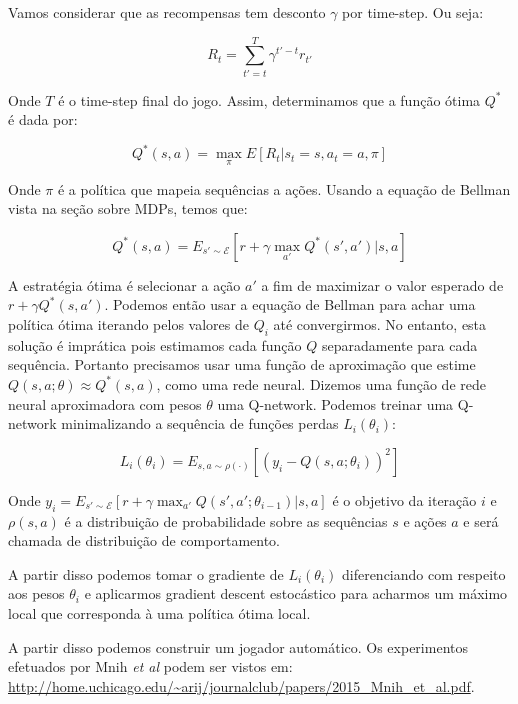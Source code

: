 \documentclass[a4paper,10pt]{article}
\theoremstyle{plain}
\begin{document}
Vamos considerar que as recompensas tem desconto $\gamma$ por time-step. Ou seja:

\begin{equation*}
  R_t = \sum_{t'=t}^T \gamma^{t'-t}r_{t'}
\end{equation*}

Onde $T$ é o time-step final do jogo. Assim, determinamos que a função ótima $Q^*$ é dada por:

\begin{equation*}
  Q^*(s,a) = \max_\pi E[R_t|s_t=s, a_t=a, \pi]
\end{equation*}

Onde $\pi$ é a política que mapeia sequências a ações. Usando a equação de Bellman vista na seção
sobre MDPs, temos que:

\begin{equation*}
  Q^*(s,a) = E_{s' \sim \mathcal{E}} \left[r+\gamma\max_{a'}Q^*(s',a')|s,a\right]
\end{equation*}

A estratégia ótima é selecionar a ação $a'$ a fim de maximizar o valor esperado de $r+\gamma Q^*(s,
a')$. Podemos então usar a equação de Bellman para achar uma política ótima iterando pelos valores
de $Q_i$ até convergirmos. No entanto, esta solução é imprática pois estimamos cada função $Q$
separadamente para cada sequência. Portanto precisamos usar uma função de aproximação que estime
$Q(s,a;\theta) \approx Q^*(s,a)$, como uma rede neural. Dizemos uma função de rede neural
aproximadora com pesos $\theta$ uma Q-network. Podemos treinar uma Q-network minimalizando a
sequência de funções perdas $L_i(\theta_i)$:

\begin{equation*}
  L_i(\theta_i) = E_{s,a \sim \rho(\cdot)} \left[(y_i - Q(s,a;\theta_i))^2\right]
\end{equation*}

Onde $y_i = E_{s' \sim \mathcal{E}} [r+\gamma\max_{a'}Q(s',a';\theta_{i-1})|s,a]$ é o objetivo da
iteração $i$ e $\rho(s, a)$ é a distribuição de probabilidade sobre as sequências $s$ e ações $a$
e será chamada de distribuição de comportamento.

A partir disso podemos tomar o gradiente de $L_i(\theta_i)$ diferenciando com respeito aos pesos
$\theta_i$ e aplicarmos gradient descent estocástico para acharmos um máximo local que corresponda
à uma política ótima local.

A partir disso podemos construir um jogador automático. Os experimentos efetuados por Mnih \textit{
et al} podem ser vistos em:
\url{http://home.uchicago.edu/~arij/journalclub/papers/2015\_Mnih\_et\_al.pdf}.
\end{document}
